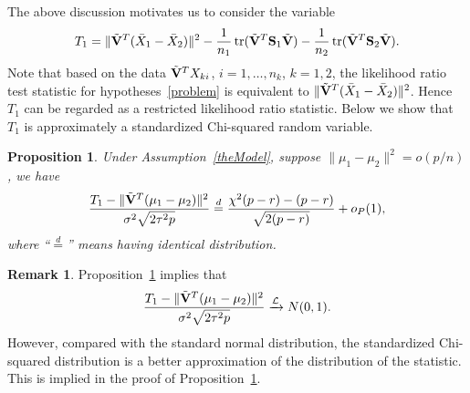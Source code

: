 \documentclass[3p]{elsarticle}
\DeclareMathOperator{\mytr}{tr}
\theoremstyle{plain}
\newtheorem{proposition}{\quad\quad Proposition}
\theoremstyle{definition}
\newtheorem{remark}{\quad\quad Remark}
\theoremstyle{remark}
\begin{document}
The above discussion motivates us to consider the variable
\begin{equation*}
\begin{aligned}
    T_1=\|\tilde{\BV}^T(\bar{X}_1-\bar{X}_2)\|^2-\frac{1}{n_1}\mytr(\tilde{\BV}^T \BS_1\tilde{\BV})-\frac{1}{n_2}\mytr(\tilde{\BV}^T \BS_2\tilde{\BV}).
    \\
\end{aligned}
\end{equation*}
 Note that based on the data $\tilde{\mathbf{V}}^T X_{ki}$, $i=1,\ldots,n_k$, $k=1,2$, the likelihood ratio test statistic for hypotheses~\eqref{problem} is equivalent to 
    $\|\tilde{\mathbf{V}}^T (\bar{X}_1-\bar{X}_2)\|^2$. 
Hence $T_1$ can be regarded as a restricted likelihood ratio statistic.
Below we show that $T_1$ is approximately a standardized Chi-squared random variable.
\begin{proposition}\label{oracleTheorem}
    Under Assumption~\ref{theModel}, suppose $\|\mu_1-\mu_2\|^2= o(p/n)$, we have 
    \begin{equation*}
        \frac{T_1-\|\tilde{\BV}^T(\mu_1-\mu_2)\|^2}
        {\sigma^2\sqrt{2\tau^2 p}}%
        \overset{d}{=} \frac{\chi^2(p-r)-(p-r)}{\sqrt{2(p-r)}}+o_P(1),
    \end{equation*}
    where ``$\overset{d}{=}$'' means having identical distribution.
\end{proposition}
\begin{remark}
    Proposition~\ref{oracleTheorem} implies that
    $$
        \frac{T_1-\|\tilde{\mathbf{V}}^T(\mu_1-\mu_2)\|^2}
        {\sigma^2\sqrt{2\tau^2 p}}\xrightarrow{\mathcal{L}}N(0,1).
    $$
    However, compared with the standard normal distribution, the standardized Chi-squared distribution is a better approximation of the distribution of the statistic.
    This is implied in the proof of Proposition~\ref{oracleTheorem}.
\end{remark}







\end{document}
